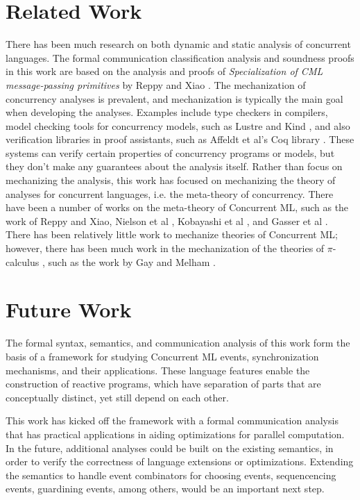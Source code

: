 \documentclass[letterpaper, 11pt]{report}
\begin{document}
\section{Related Work}
There has been much research on both dynamic and static analysis of concurrent languages. 
The formal communication classification analysis and soundness proofs in this work are
based on the analysis and proofs of \textit{Specialization of CML message-passing primitives}
by Reppy and Xiao \cite{reppy2007specialization}.
The mechanization of concurrency analyses is prevalent, and mechanization is typically the main
goal when developing the analyses. Examples include type checkers in compilers,
model checking tools for concurrency models, such as Lustre \cite{halbwachs1991synchronous} and Kind \cite{kind},
and also verification libraries in proof assistants, such as Affeldt et al's Coq library \cite{affeldt2008coq}.
These systems can verify certain properties of concurrency programs or models, but they don't
make any guarantees about the analysis itself.
Rather than focus on mechanizing the analysis, this work has focused on
mechanizing the theory of analyses for concurrent languages, i.e. the meta-theory of concurrency.
There have been a number of works on the meta-theory of Concurrent ML,
such as the work of Reppy and Xiao, Nielson et al \cite{nielson1994higher}, Kobayashi et al \cite{kobayashi1995static}, and Gasser et al \cite{gasser1997systematic}.
There has been relatively little work to mechanize theories of Concurrent ML; however,
there has been much work in the mechanization of the theories of $\pi$-calculus
\cite{milner1999communicating}, such as the work by Gay \cite{gay2001framework} and Melham \cite{melham1994mechanized}. 

\section{Future Work}
The formal syntax, semantics, and communication analysis of this work form the basis of
a framework for studying Concurrent ML events, synchronization mechanisms, and their
applications. These language features enable the construction of reactive programs, which
have separation of parts that are conceptually distinct, yet still depend on each
other.

This work has kicked off the framework with a formal communication analysis that has practical
applications in aiding optimizations for parallel computation. In the future, additional
analyses could be built on the existing semantics, in order to verify the correctness of language 
extensions or optimizations. Extending the semantics to handle event combinators for choosing
events, sequencencing events, guardining events, among others, would be an important next step.
\end{document}
